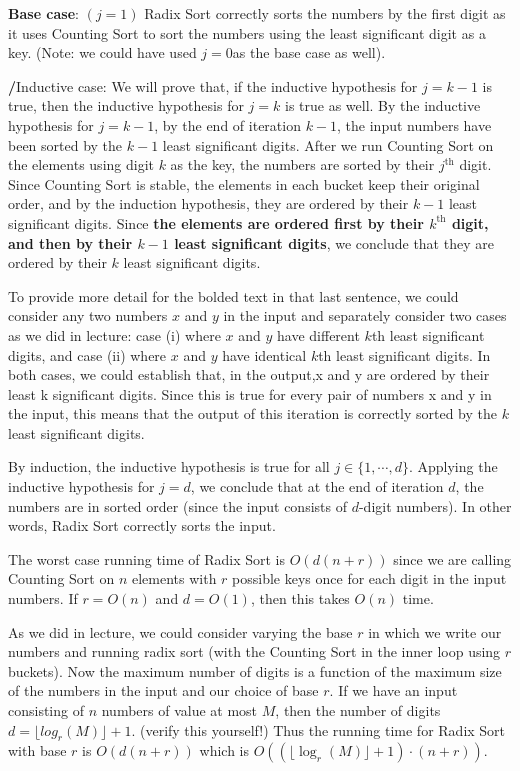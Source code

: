 \documentclass [12pt]{article}
\begin{document}
\textbf{Base case}: $(j = 1)$ Radix Sort correctly sorts the numbers by the first digit as it uses Counting Sort to sort the numbers using the least significant digit as a key. (Note: we could have used $j = 0 $as the base case as well).

\textbf/{Inductive case}: We will prove that, if the inductive hypothesis for $j = k -1$ is true, then the inductive hypothesis for $j = k$ is true as well.
By the inductive hypothesis for $j = k - 1$, by the end of iteration $k - 1$, the input numbers have been sorted by the $k - 1$ least significant digits. After we run Counting Sort on the elements using digit $k$ as the key, the numbers are sorted by their $j^{\text{th}}$ digit. Since Counting Sort is stable, the elements in each bucket keep their original order, and by the induction hypothesis, they are ordered by their $k - 1$ least significant digits. Since \textbf{the elements are ordered first by their $k^{\text{th}}$ digit, and then by their $k -1$ least significant digits}, we conclude that they are ordered by their $k$ least significant digits.

To provide more detail for the bolded text in that last sentence, we could consider any two numbers $x$ and $y$ in the input and separately consider two cases as we did in lecture: case (i) where $x$ and $y$ have different $k$th least significant digits, and case (ii) where $x$ and $y$ have
identical $k$th least significant digits. In both cases, we could establish that, in the output,x and y are ordered by their least k significant digits. Since this is true for every pair of
numbers x and y in the input, this means that the output of this iteration is correctly sorted by the $k$ least significant digits.

By induction, the inductive hypothesis is true for all $j \in \{1, \cdots , d\}$. Applying the inductive hypothesis for $j = d$, we conclude that at the end of iteration $d$, the numbers are in sorted order (since the input consists of $d$-digit numbers). In other words, Radix Sort correctly sorts the input.

The worst case running time of Radix Sort is $O(d(n + r ))$ since we are calling Counting Sort on $n$ elements with $r$ possible keys once for each digit in the input numbers. If $r = O(n)$ and $d = O(1)$, then this takes $O(n)$ time.

As we did in lecture, we could consider varying the base $r$ in which we write our numbers and running radix sort (with the Counting Sort in the inner loop using $r$ buckets). Now the maximum number of digits is a function of the maximum size of the numbers in the input and our choice of base $r$. If we have an input consisting of $n$ numbers of value at most $M$, then the number of digits $d = \lfloor log_r (M)\rfloor + 1$. (verify this yourself!) Thus the running time for Radix Sort with base $r$ is $O(d(n + r ))$ which is $O((\lfloor \log_r (M)\rfloor + 1) \cdot (n + r )).$
\end{document}
